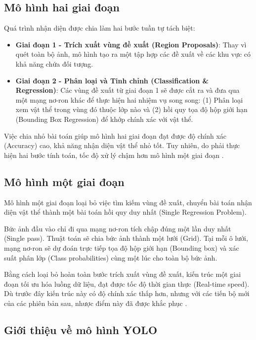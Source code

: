 \subsection{Mô hình hai giai đoạn}

Quá trình nhận diện được chia làm hai bước tuần tự tách biệt:
\begin{itemize}
	\item \textbf{Giai đoạn 1 - Trích xuất vùng đề xuất (Region Proposals)}: Thay vì quét toàn bộ ảnh, mô hình tạo ra một tập hợp các đề xuất về các khu vực có khả năng chứa đối tượng.
	
	\item \textbf{Giai đoạn 2 - Phân loại và Tinh chỉnh (Classification \& Regression)}: Các vùng đề xuất từ giai đoạn 1 sẽ được cắt ra và đưa qua một mạng nơ-ron khác để thực hiện hai nhiệm vụ song song: (1) Phân loại xem vật thể trong vùng đó thuộc lớp nào và (2) hồi quy tọa độ hộp giới hạn (Bounding Box Regression) để khớp chính xác với vật thể.
\end{itemize}

Việc chia nhỏ bài toán giúp mô hình hai giai đoạn đạt được độ chính xác (Accuracy) cao, khả năng nhận diện vật thể nhỏ tốt. Tuy nhiên, do phải thực hiện hai bước tính toán, tốc độ xử lý chậm hơn mô hình một giai đoạn \cite{detection}.

\subsection{Mô hình một giai đoạn}

Mô hình một giai đoạn loại bỏ việc tìm kiếm vùng đề xuất, chuyển bài toán nhận diện vật thể thành một bài toán hồi quy duy nhất (Single Regression Problem).

Bức ảnh đầu vào chỉ đi qua mạng nơ-ron tích chập đúng một lần duy nhất (Single pass). Thuật toán sẽ chia bức ảnh thành một lưới (Grid). Tại mỗi ô lưới, mạng nơ-ron sẽ dự đoán trực tiếp tọa độ hộp giới hạn (Bounding box) và xác suất phân lớp (Class probabilities) cùng một lúc cho toàn bộ bức ảnh.

Bằng cách loại bỏ hoàn toàn bước trích xuất vùng đề xuất, kiến trúc một giai đoạn tối ưu hóa luồng dữ liệu, đạt được tốc độ thời gian thực (Real-time speed). Dù trước đây kiến trúc này có độ chính xác thấp hơn, nhưng với các tiến bộ mới của các phiên bản sau, nhược điểm này đã được khắc phục \cite{detection}.

\subsection{Giới thiệu về mô hình YOLO}

